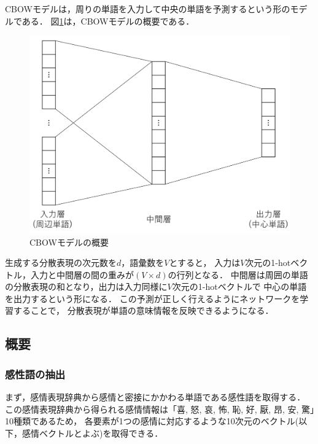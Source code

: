 	CBOWモデルは，周りの単語を入力して中央の単語を予測するという形のモデルである．
	図\ref{fig:CBOW}は，CBOWモデルの概要である．

	\begin{figure}[H]
		\centering
		\includegraphics[width=\linewidth]{./figure/CBOW.png}
		\caption{CBOWモデルの概要}
		\label{fig:CBOW}
	\end{figure}

	生成する分散表現の次元数を$d$，語彙数を$V$とすると，
	入力は$V$次元の1-hotベクトル，入力と中間層の間の重みが$(V \times d)$の行列となる．
	中間層は周囲の単語の分散表現の和となり，出力は入力同様に$V$次元の1-hotベクトルで
	中心の単語を出力するという形になる．
	この予測が正しく行えるようにネットワークを学習することで，
	分散表現が単語の意味情報を反映できるようになる．
	

	\subsection{概要}
		\subsubsection{感性語の抽出}
			まず，感情表現辞典\cite{kanjou_hyogen_jiten}から感情と密接にかかわる単語である感性語を取得する．
			この感情表現辞典から得られる感情情報は「喜, 怒, 哀, 怖, 恥, 好, 厭, 昂, 安, 驚」10種類であるため，
			各要素が1つの感情に対応するような10次元のベクトル(以下，感情ベクトルとよぶ)を取得できる．

